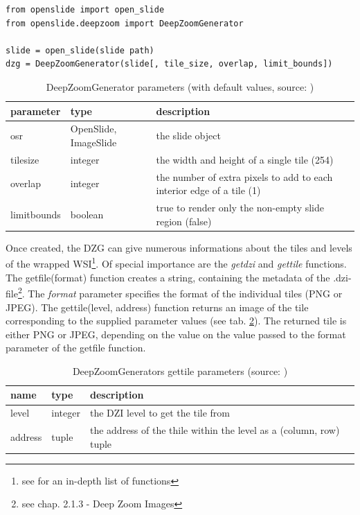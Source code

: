 \begin{lstlisting}[frame=single]
from openslide import open_slide
from openslide.deepzoom import DeepZoomGenerator

slide = open_slide(slide path)
dzg = DeepZoomGenerator(slide[, tile_size, overlap, limit_bounds])
\end{lstlisting}

\begin{table}[H]
	\begin{center}
		\begin{tabular}{| p{2.5cm} | p{2cm} | p{5.5cm} |}
			\hline
			\textbf{parameter} & \textbf{type} & \textbf{description}\\ \hline
			osr & OpenSlide, ImageSlide & the slide object
			\\ \hline
			tile{\textunderscore}size & integer & the width and height of a single tile (254)\\ \hline
			overlap & integer & the number of extra pixels to add to each interior edge of a tile (1)\\ \hline
			limit{\textunderscore}bounds & boolean & true to render only the non-empty slide region (false)\\ \hline
		\end{tabular}
		\caption{DeepZoomGenerator parameters (with default values, source: \cite{web:openslide})}
		\label{tab4_DZGparam}
	\end{center}
\end{table}

Once created, the DZG can give numerous informations about the tiles and levels of the wrapped WSI\footnote{see \cite{web:openslide} for an in-depth list of functions}. Of special importance are the \emph{get{\textunderscore}dzi} and \emph{get{\textunderscore}tile} functions. The get{\textunderscore}file(format) function creates a string, containing the metadata of the .dzi-file\footnote{see chap. 2.1.3 - Deep Zoom Images}. The \emph{format} parameter specifies the format of the individual tiles (PNG or JPEG). The get{\textunderscore}tile(level, address) function returns an image of the tile corresponding to the supplied parameter values (see tab. \ref{tab4_getTileParams}). The returned tile is either PNG or JPEG, depending on the value on the value passed to the format parameter of the get{\textunderscore}file function.

\begin{table}[H]
	\begin{center}
		\begin{tabular}{| p{1.5cm} | p{1.5cm} | p{7cm} |}
			\hline
			\textbf{name} & \textbf{type} & \textbf{description}\\ \hline
			level & integer & the DZI level to get the tile from \\ \hline
			address & tuple & the address of the thile within the level as a (column, row) tuple\\ \hline
		\end{tabular}
		\caption{DeepZoomGenerators get{\textunderscore}tile parameters (source: \cite{web:openslide})}
		\label{tab4_getTileParams}
	\end{center}
\end{table}

